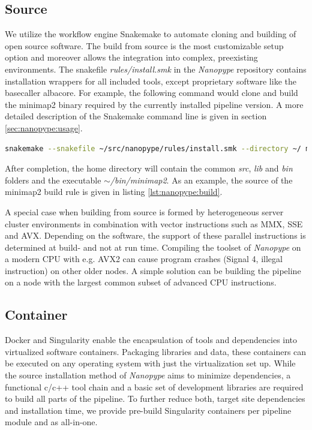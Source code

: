 \subsection{Source}

We utilize the workflow engine Snakemake to automate cloning and building of open source software. The build from source is the most customizable setup option and moreover allows the integration into complex, preexisting environments. The snakefile \textit{rules/install.smk} in the \textit{Nanopype} repository contains installation wrappers for all included tools, except proprietary software like the basecaller albacore. For example, the following command would clone and build the minimap2 binary required by the currently installed pipeline version. A more detailed description of the Snakemake command line is given in section \ref{sec:nanopype:usage}.

\begin{lstlisting}[language=sh, caption=Snakemake tool installation example]
snakemake --snakefile ~/src/nanopype/rules/install.smk --directory ~/ minimap2
\end{lstlisting}

After completion, the home directory will contain the common \textit{src}, \textit{lib} and \textit{bin} folders and the executable $\sim$\textit{/bin/minimap2}. As an example, the source of the minimap2 build rule is given in listing \ref{lst:nanopype:build}.

A special case when building from source is formed by heterogeneous server cluster environments in combination with vector instructions such as MMX, SSE and AVX. Depending on the software, the support of these parallel instructions is determined at build- and not at run time. Compiling the toolset of \textit{Nanopype} on a modern CPU with e.g. AVX2 can cause program crashes (Signal 4, illegal instruction) on other older nodes. A simple solution can be building the pipeline on a node with the largest common subset of advanced CPU instructions.


\subsection{Container}

Docker and Singularity enable the encapsulation of tools and dependencies into virtualized software containers. Packaging libraries and data, these containers can be executed on any operating system with just the virtualization set up. While the source installation method of \textit{Nanopype} aims to minimize dependencies, a functional c/c++ tool chain and a basic set of development libraries are required to build all parts of the pipeline. To further reduce both, target site dependencies and installation time, we provide pre-build Singularity containers per pipeline module and as all-in-one.

